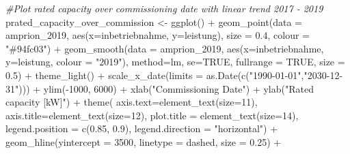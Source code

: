 \documentclass[a4paper,11pt]{article}
\newenvironment{Shaded}{\begin{snugshade}}{\end{snugshade}}
\newcommand{\AttributeTok}[1]{\textcolor[rgb]{0.77,0.63,0.00}{#1}}
\newcommand{\CommentTok}[1]{\textcolor[rgb]{0.56,0.35,0.01}{\textit{#1}}}
\newcommand{\ConstantTok}[1]{\textcolor[rgb]{0.00,0.00,0.00}{#1}}
\newcommand{\DecValTok}[1]{\textcolor[rgb]{0.00,0.00,0.81}{#1}}
\newcommand{\FloatTok}[1]{\textcolor[rgb]{0.00,0.00,0.81}{#1}}
\newcommand{\FunctionTok}[1]{\textcolor[rgb]{0.00,0.00,0.00}{#1}}
\newcommand{\NormalTok}[1]{#1}
\newcommand{\OtherTok}[1]{\textcolor[rgb]{0.56,0.35,0.01}{#1}}
\newcommand{\SpecialCharTok}[1]{\textcolor[rgb]{0.00,0.00,0.00}{#1}}
\newcommand{\StringTok}[1]{\textcolor[rgb]{0.31,0.60,0.02}{#1}}
\begin{document}
\begin{Shaded}
\begin{Highlighting}[]
\CommentTok{\#Plot rated capacity over commissioning date with linear trend 2017 {-} 2019}
\NormalTok{prated\_capacity\_over\_commission }\OtherTok{\textless{}{-}} \FunctionTok{ggplot}\NormalTok{() }\SpecialCharTok{+}
  \FunctionTok{geom\_point}\NormalTok{(}\AttributeTok{data =}\NormalTok{ amprion\_2019, }
             \FunctionTok{aes}\NormalTok{(}\AttributeTok{x=}\NormalTok{inbetriebnahme, }\AttributeTok{y=}\NormalTok{leistung), }
             \AttributeTok{size =} \FloatTok{0.4}\NormalTok{, }\AttributeTok{colour =} \StringTok{"\#94fc03"}\NormalTok{) }\SpecialCharTok{+}
  \FunctionTok{geom\_smooth}\NormalTok{(}\AttributeTok{data =}\NormalTok{ amprion\_2019, }
              \FunctionTok{aes}\NormalTok{(}\AttributeTok{x=}\NormalTok{inbetriebnahme, }\AttributeTok{y=}\NormalTok{leistung, }\AttributeTok{colour =} \StringTok{"2019"}\NormalTok{), }
              \AttributeTok{method=}\NormalTok{lm, }\AttributeTok{se=}\ConstantTok{TRUE}\NormalTok{, }\AttributeTok{fullrange =} \ConstantTok{TRUE}\NormalTok{, }\AttributeTok{size =} \FloatTok{0.5}\NormalTok{)  }\SpecialCharTok{+}
  \FunctionTok{theme\_light}\NormalTok{() }\SpecialCharTok{+}
  \FunctionTok{scale\_x\_date}\NormalTok{(}\AttributeTok{limits =} \FunctionTok{as.Date}\NormalTok{(}\FunctionTok{c}\NormalTok{(}\StringTok{"1990{-}01{-}01"}\NormalTok{,}\StringTok{"2030{-}12{-}31"}\NormalTok{))) }\SpecialCharTok{+}
  \FunctionTok{ylim}\NormalTok{(}\SpecialCharTok{{-}}\DecValTok{1000}\NormalTok{, }\DecValTok{6000}\NormalTok{) }\SpecialCharTok{+}
  \FunctionTok{xlab}\NormalTok{(}\StringTok{"Commissioning Date"}\NormalTok{) }\SpecialCharTok{+}
  \FunctionTok{ylab}\NormalTok{(}\StringTok{"Rated capacity [kW]"}\NormalTok{) }\SpecialCharTok{+}
  \FunctionTok{theme}\NormalTok{( }\AttributeTok{axis.text=}\FunctionTok{element\_text}\NormalTok{(}\AttributeTok{size=}\DecValTok{11}\NormalTok{),}
         \AttributeTok{axis.title=}\FunctionTok{element\_text}\NormalTok{(}\AttributeTok{size=}\DecValTok{12}\NormalTok{),}
         \AttributeTok{plot.title =} \FunctionTok{element\_text}\NormalTok{(}\AttributeTok{size=}\DecValTok{14}\NormalTok{),}
         \AttributeTok{legend.position =} \FunctionTok{c}\NormalTok{(}\FloatTok{0.85}\NormalTok{, }\FloatTok{0.9}\NormalTok{),}
         \AttributeTok{legend.direction =} \StringTok{"horizontal"}\NormalTok{) }\SpecialCharTok{+}
  \FunctionTok{geom\_hline}\NormalTok{(}\AttributeTok{yintercept =} \DecValTok{3500}\NormalTok{, }\AttributeTok{linetype =} \StringTok{\textquotesingle{}dashed\textquotesingle{}}\NormalTok{, }\AttributeTok{size =} \FloatTok{0.25}\NormalTok{) }\SpecialCharTok{+}

\end{Highlighting}
\end{Shaded}
\end{document}
